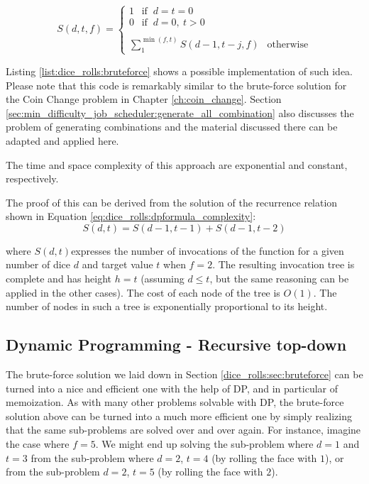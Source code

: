 \begin{equation}
	S(d,t,f)=\begin{cases}
		 1 \: \: \text{ if } \: d=t=0 \\
		 0 \: \: \text{ if } \: d=0, \: t>0 \\ \\
		\sum_{1}^{\min(f,t)} S(d-1,t-j,f)  \:\: \text{ otherwise}
	 \end{cases}
	\label{eq:dice_rolls:dpformula}
\end{equation}

Listing \ref{list:dice_rolls:bruteforce} shows a possible implementation of such idea. Please note
that this code is remarkably similar to the brute-force solution for the Coin Change problem in
Chapter \ref{ch:coin_change}. Section
\ref{sec:min_difficulty_job_scheduler:generate_all_combination} also discusses the problem of
generating combinations and the material discussed there can be adapted and applied here.




The time and space complexity of this approach are exponential and constant, respectively.
 
The proof of this can be derived from the solution of the recurrence relation shown in Equation \ref{eq:dice_rolls:dpformula_complexity}:
\begin{equation}
	S(d,t) = S(d-1,t-1) + S(d-1,t-2)
\label{eq:dice_rolls:dpformula_complexity}
\end{equation}

where $S(d,t)$expresses the number of invocations of the function 
for a given number of dice $d$ and target value $t$ when $f=2$. 
The resulting invocation tree is
complete and has height $h=t$ (assuming $d \leq t$, but the same reasoning can be applied in the
other cases). 
The cost of each node of the tree is $O(1)$. The number of nodes in such a tree is
exponentially proportional to its height. 



\subsection{Dynamic Programming - Recursive top-down}
\label{dice_rolls:sec:DP}
The brute-force solution we laid down in Section \ref{dice_rolls:sec:bruteforce} can  be turned into a nice and
efficient one with the help of DP, and in particular of memoization. As with many other problems
solvable with DP, the brute-force solution above can be turned into a much more
efficient one by simply realizing that the same sub-problems are solved over and over again.
For instance, imagine the case where $f=5$. We might end up solving the sub-problem where $d=1$ and
$t=3$  from the sub-problem where $d=2$, $t=4$ (by rolling the face with $1$), or from the
sub-problem $d=2$, $t=5$ (by rolling the face with $2$).

